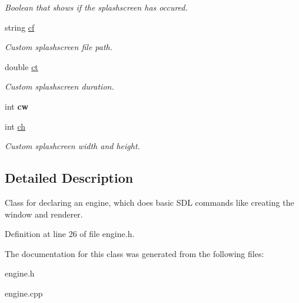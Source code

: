 \begin{DoxyCompactItemize}
\begin{DoxyCompactList}\small\item\em Boolean that shows if the splashscreen has occured. \end{DoxyCompactList}\item 
string \hyperlink{classEngine_af5917b4f27bb16bf68b074b62c0e5587}{cf}\hypertarget{classEngine_af5917b4f27bb16bf68b074b62c0e5587}{}\label{classEngine_af5917b4f27bb16bf68b074b62c0e5587}

\begin{DoxyCompactList}\small\item\em Custom splashscreen file path. \end{DoxyCompactList}\item 
double \hyperlink{classEngine_a6e76eccd4f6e976a2068b9eb0acb4e85}{ct}\hypertarget{classEngine_a6e76eccd4f6e976a2068b9eb0acb4e85}{}\label{classEngine_a6e76eccd4f6e976a2068b9eb0acb4e85}

\begin{DoxyCompactList}\small\item\em Custom splashscreen duration. \end{DoxyCompactList}\item 
int {\bfseries cw}\hypertarget{classEngine_aff6e103dd58c2ea3b7798e7bc52db361}{}\label{classEngine_aff6e103dd58c2ea3b7798e7bc52db361}

\item 
int \hyperlink{classEngine_a2acd0bd074160e654d076376d36a3479}{ch}\hypertarget{classEngine_a2acd0bd074160e654d076376d36a3479}{}\label{classEngine_a2acd0bd074160e654d076376d36a3479}

\begin{DoxyCompactList}\small\item\em Custom splashcreen width and height. \end{DoxyCompactList}\end{DoxyCompactItemize}


\subsection{Detailed Description}
Class for declaring an engine, which does basic S\+DL commands like creating the window and renderer. 

Definition at line 26 of file engine.\+h.



The documentation for this class was generated from the following files\+:\begin{DoxyCompactItemize}
\item 
engine.\+h\item 
engine.\+cpp\end{DoxyCompactItemize}
